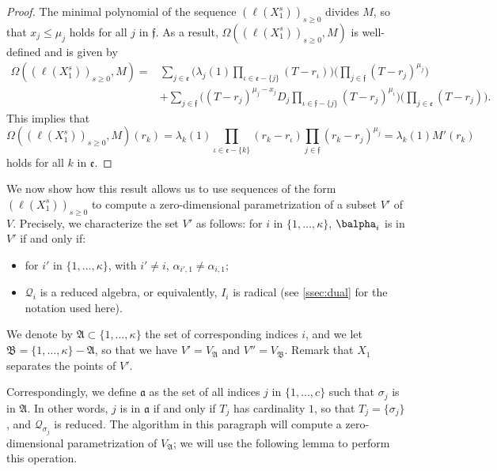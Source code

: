 \documentclass[12pt]{article}
\newcommand{\residueI}{\mathscr{Q}}
\def\dg{\kappa}
\begin{document}
\begin{proof}

        The minimal polynomial of the sequence $(\ell(X_1^s))_{s \ge
          0}$ divides $M$, so that $x_j \le \mu_j$ holds for all $j$
        in $\mathfrak{f}$.  As a result,
        $\Omega((\ell(X_1^s))_{s\ge0},M)$ is well-defined and is given by
	\begin{align*}
	\Omega((\ell(X_1^s))_{s\ge0},M)=&
	\sum_{j \in \mathfrak{e}}
	\Big(
	\lambda_j(1) \prod_{\iota \in \mathfrak{e}-\{j\}}(T-r_\iota)\Big)
	\Big(\prod_{j \in \mathfrak{f}}(T-r_j)^{\mu_j} \Big)\\
	&+
	\sum_{j\in \mathfrak{f}}
	\Big(  (T-r_j)^{\mu_j-x_j} D_j
	\prod_{\iota \in \mathfrak{f}-\{j\}}(T-r_j)^{\mu_\iota}\Big)
	\Big(\prod_{j\in \mathfrak{e}} (T-r_j) \Big).
	\end{align*}
	This implies that $$\Omega((\ell(X_1^s))_{s\ge0},M)(r_k) =\lambda_k(1) 
	\prod_{\iota \in \mathfrak{e}-\{k\}}(r_k-r_\iota)
	\prod_{j \in \mathfrak{f}}(r_k-r_j)^{\mu_j} = \lambda_k(1) M'(r_k)$$ 
	holds for all $k$ in $\mathfrak{e}$.
\end{proof}

We now show how this result allows us to use sequences of the form
$(\ell(X_1^s))_{s \ge 0}$ to compute a zero-dimensional
parametrization of a subset $V'$ of $V$. Precisely, we characterize
the set $V'$ as follows: for $i$ in $\{1,\dots,\dg\}$, $\balpha_i$ is
in $V'$ if and only if:
\begin{itemize}
	\item for $i'$ in $\{1,\dots,\dg\}$, with $i'\ne i$, $\alpha_{i',1} \ne
	\alpha_{i,1}$;
	\item $\residueI_i$ is a reduced algebra, or equivalently, $I_i$ is radical (see \cref{ssec:dual} 
          for the notation used here).
\end{itemize}
We denote by $\mathfrak{A}\subset \{1,\dots,\dg\}$ the set of
corresponding indices $i$, and we let
$\mathfrak{B}=\{1,\dots,\dg\}-\mathfrak{A}$, so that we have
$V'=V_{\mathfrak{A}}$ and $V''=V_{\mathfrak{B}}$.  Remark that $X_1$
separates the points of $V'$.

Correspondingly, we define $\mathfrak{a}$ as the set of all indices
$j$ in $\{1,\dots,c\}$ such that $\sigma_j$ is in $\mathfrak{A}$. In
other words, $j$ is in $\mathfrak{a}$ if and only if $T_j$ has
cardinality $1$, so that $T_j=\{\sigma_j\}$, and
$\residueI_{\sigma_j}$ is reduced.  The algorithm in this paragraph
will compute a zero-dimensional parametrization of $V_{\mathfrak{A}}$;
we will use the following lemma to perform this operation.
\end{document}
